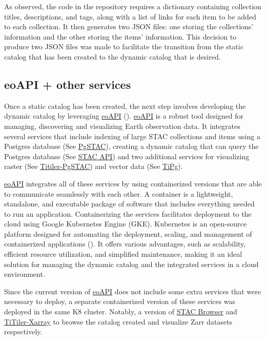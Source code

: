 \documentclass[
  oneside,
  open=any]{scrbook}
\begin{document}
As observed, the code in the repository requires a dictionary containing
collection titles, descriptions, and tags, along with a list of links
for each item to be added to each collection. It then generates two JSON
files: one storing the collections' information and the other storing
the items' information. This decision to produce two JSON files was made
to facilitate the transition from the static catalog that has been
created to the dynamic catalog that is desired.

\subsection{eoAPI + other services}\label{sec-eoapi}

Once a static catalog has been created, the next step involves
developing the dynamic catalog by leveraging
\href{https://eoapi.dev/}{eoAPI}
().
\href{https://eoapi.dev/}{eoAPI} is a robust tool designed for managing,
discovering and visualizing Earth observation data. It integrates
several services that include indexing of large STAC collections and
items using a Postgres database (See
\href{https://github.com/stac-utils/pgstac}{PgSTAC}), creating a dynamic
catalog that can query the Postgres database (See
\href{https://github.com/stac-utils/stac-fastapi}{STAC API}) and two
additional services for visualizing raster (See
\href{https://github.com/stac-utils/titiler-pgstac}{Titiler-PgSTAC}) and
vector data (See \href{https://github.com/developmentseed/tipg}{TiPg}).

\href{https://eoapi.dev/}{eoAPI} integrates all of these services by
using containerized versions that are able to communicate seamlessly
with each other. A container is a lightweight, standalone, and
executable package of software that includes everything needed to run an
application. Containerizing the services facilitates deployment to the
cloud using Google Kubernetes Engine (GKE). Kubernetes is an open-source
platform designed for automating the deployment, scaling, and management
of containerized applications
(). It offers
various advantages, such as scalability, efficient resource utilization,
and simplified maintenance, making it an ideal solution for managing the
dynamic catalog and the integrated services in a cloud environment.

Since the current version of \href{https://eoapi.dev/}{eoAPI} does not
include some extra services that were necessary to deploy, a separate
containerized version of these services was deployed in the same K8
cluster. Notably, a version of
\href{https://github.com/radiantearth/stac-browser}{STAC Browser} and
\href{https://github.com/developmentseed/titiler-xarray}{TiTiler-Xarray}
to browse the catalog created and visualize Zarr datasets respectively.
\end{document}
